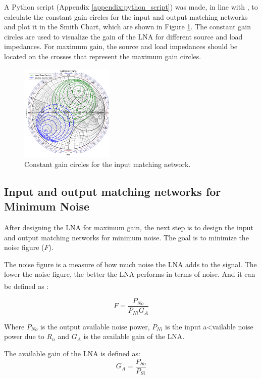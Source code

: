 A Python script (Appendix \ref{appendix:python_script}) was made, in line with \cite{Gillermo-Gonzalez}, to calculate the constant gain circles for the input and output matching networks and plot it in the Smith Chart, which are shown in Figure \ref{fig:ConstantGainCircles}. The constant gain circles are used to visualize the gain of the LNA for different source and load impedances. For maximum gain, the source and load impedances should be located on the crosses that represent the maximum gain circles.
\begin{figure}[H]
    \centering
    \includegraphics[width=0.4\textwidth]{Images/ConstantGainCircles.png}
    \caption{Constant gain circles for the input matching network.}
    \label{fig:ConstantGainCircles}
\end{figure}

\subsection{Input and output matching networks for Minimum Noise}

After designing the LNA for maximum gain, the next step is to design the input and output matching networks for minimum noise. The goal is to minimize the noise figure ($F$). 

The noise figure is a measure of how much noise the LNA adds to the signal. The lower the noise figure, the better the LNA performs in terms of noise. And it can be defined as \textsuperscript{\cite{Gillermo-Gonzalez}}:

\begin{equation}
    F = \frac{P_{No}}{P_{Ni}G_A}
    \label{eq:NoiseFigure}
\end{equation}

Where $P_{No}$ is the output available noise power, $P_{Ni}$ is the input a<vailable noise power due to $R_n$ and $G_A$ is the available gain of the LNA.

The available gain of the LNA is defined as:
\begin{equation}
    G_A = \frac{P_{So}}{P_{Si}}
    \label{eq:AvailableGain}
\end{equation}

